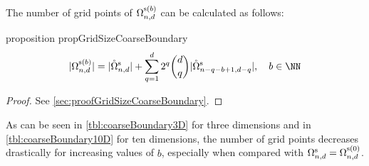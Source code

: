 The number of grid points of $\Omega_{n,d}^{\mathrm{s}(b)}$
can be calculated as follows:
\begin{restatable}{%
  proposition%
}{%
  propGridSizeCoarseBoundary%
}
  \label{prop:gridSizeCoarseBoundary}
  \label{PROP:GRIDSIZECOARSEBOUNDARY}
  \setlength{\abovedisplayskip}{0pt}
  \begin{equation}
    |\Omega_{n,d}^{\sparse(b)}|
    = |\interior{\Omega}_{n,d}^\sparse| +
    \sum_{q=1}^d 2^q \binom{d}{q}
    |\interior{\Omega}_{n-q-b+1,d-q}^\sparse|,\quad
    b \in \NN
  \end{equation}
\end{restatable}
\begin{proof}
  See \cref{sec:proofGridSizeCoarseBoundary}.
\end{proof}
As can be seen in \cref{tbl:coarseBoundary3D} for three dimensions and
in \cref{tbl:coarseBoundary10D} for ten dimensions,
the number of grid points decreases drastically for increasing values
of $b$, especially when compared with
$\Omega_{n,d}^{\mathrm{s}} = \Omega_{n,d}^{\mathrm{s}(0)}$.

